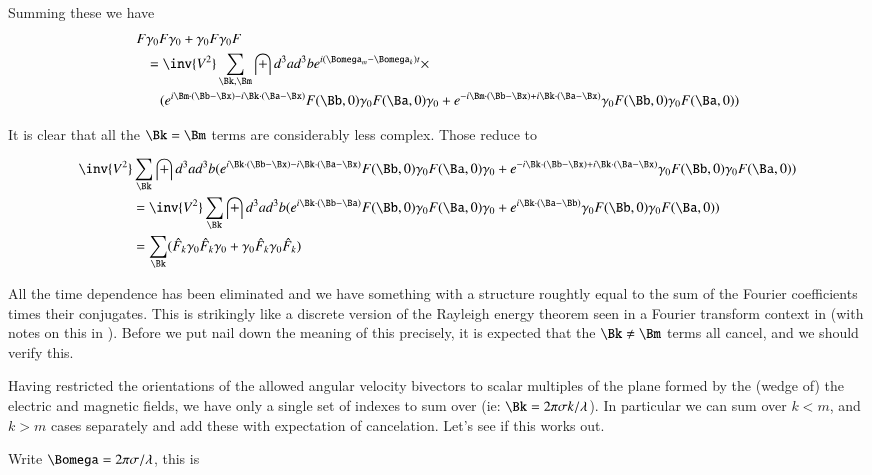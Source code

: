 \documentclass{article}
\begin{document}
Summing these we have
\begin{align*}
F &\gamma_0 F \gamma_0 + \gamma_0 F \gamma_0 F \\
&=\inv{V^2} \sum_{\Bk,\Bm} \int d^3 a d^3 b e^{i (\Bomega_m -\Bomega_k) t } \times \\
&\quad (e^{   i \Bm \cdot (\Bb-\Bx) - i \Bk \cdot (\Ba-\Bx) } F(\Bb, 0) \gamma_0 F(\Ba, 0) \gamma_0  
+e^{ - i \Bm \cdot (\Bb-\Bx) + i \Bk \cdot (\Ba-\Bx) } \gamma_0 F(\Bb, 0) \gamma_0 F(\Ba, 0))
\end{align*}

It is clear that all the $\Bk = \Bm$ terms are considerably less complex.  Those reduce to

\begin{align*}
\inv{V^2} &\sum_{\Bk} \int d^3 a d^3 b (e^{   i \Bk \cdot (\Bb-\Bx) - i \Bk \cdot (\Ba-\Bx) } F(\Bb, 0) \gamma_0 F(\Ba, 0) \gamma_0  
+e^{ - i \Bk \cdot (\Bb-\Bx) + i \Bk \cdot (\Ba-\Bx) } \gamma_0 F(\Bb, 0) \gamma_0 F(\Ba, 0)) \\
&=
\inv{V^2} \sum_{\Bk} \int d^3 a d^3 b (e^{   i \Bk \cdot (\Bb - \Ba) } F(\Bb, 0) \gamma_0 F(\Ba, 0) \gamma_0  
+e^{ i \Bk \cdot (\Ba -\Bb) } \gamma_0 F(\Bb, 0) \gamma_0 F(\Ba, 0)) \\
&=
\sum_{\Bk} ( \hat{F}_k \gamma_0 \hat{F}_k \gamma_0 + \gamma_0 \hat{F}_k \gamma_0 \hat{F}_k ) \\
\end{align*}

All the time dependence has been eliminated and we have something with a structure roughtly equal to the sum of the Fourier coefficients 
times their conjugates.  This is strikingly like a discrete version of the Rayleigh energy theorem seen in 
a Fourier transform context in \cite{haykin1994cs} (with notes on this in \cite{PJqmFourier}).
Before we put nail down the meaning of this precisely, it is expected that 
the $\Bk \ne \Bm$ terms all cancel, and we should verify this.

Having restricted the orientations of the allowed angular velocity bivectors to scalar multiples of the plane formed by the (wedge of) the electric 
and magnetic fields, we have only a single set of indexes to sum over (ie: $\Bk = 2 \pi \sigma k/ \lambda$).
In particular we can sum over $k < m$, and $k > m$ cases separately and add these
with expectation of cancelation.  Let's see if this works out.

Write $\Bomega = 2 \pi \sigma / \lambda$, this is
\end{document}
